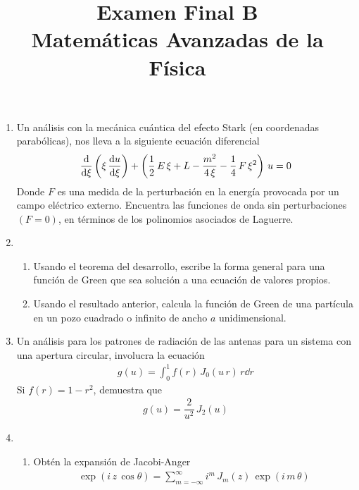 
\author{}
\title{Examen Final B  \\ \large{Matemáticas Avanzadas de la Física}} \vspace{-1.5\baselineskip}
\date{ }

\vspace{-4cm}
\renewcommand\labelenumii{\theenumi.{\arabic{enumii})}}
\maketitle
\fontsize{14}{14}\selectfont
\begin{enumerate}
\item Un análisis con la mecánica cuántica del efecto Stark (en coordenadas parabólicas), nos lleva a la siguiente ecuación diferencial
\begin{align*}
\dv{\xi} \left( \xi \, \dv{u}{\xi}  \right) + \left( \dfrac{1}{2} \, E \, \xi + L - \dfrac{m^{2}}{4 \, \xi} - \dfrac{1}{4} \, F \, \xi^{2} \right) \, u = 0
\end{align*}
Donde $F$ es una medida de la perturbación en la energía provocada por un campo eléctrico externo. Encuentra las funciones de onda sin perturbaciones $(F=0)$, en términos de los polinomios asociados de Laguerre.
\item \begin{enumerate}
\item Usando el teorema del desarrollo, escribe la forma general para una función de Green que sea solución a una ecuación de valores propios.
\item Usando el resultado anterior, calcula la función de Green de una partícula en un pozo cuadrado o infinito de ancho $a$ unidimensional.
\end{enumerate}
\item Un análisis para los patrones de radiación de las antenas para un sistema con una apertura circular, involucra la ecuación
\begin{align*}
g(u) = \int_{0}^{1} f(r) \, J_{0} (u \, r) \, r \dd{r}
\end{align*}
Si $f(r) = 1 - r^{2}$, demuestra que
\begin{align*}
g(u) = \dfrac{2}{u^{2}} \, J_{2}(u)
\end{align*}
\item \begin{enumerate}
\item Obtén la expansión de Jacobi-Anger
\begin{align*}
\exp(i \, z \, \cos \theta) = \sum_{m=-\infty}^{\infty} i^{m} \, J_{m}(z) \, \exp(i \, m \, \theta)

\end{align*}
\end{enumerate}
\end{enumerate}
